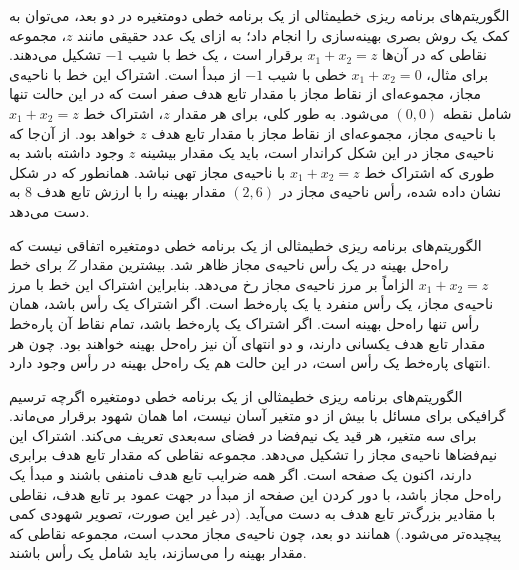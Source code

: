 \begin{itemframe-s}{الگوریتم‌های برنامه ریزی خطی}{مثالی از یک برنامه خطی دو‌متغیره}
\itm
در دو بعد، می‌توان به کمک یک روش بصری بهینه‌سازی را انجام داد؛
به ازای یک عدد حقیقی مانند
$z$،
مجموعه نقاطی که در آن‌ها
$x_1 + x_2 = z$
برقرار است ، یک خط با شیب $-1$ تشکیل می‌دهند.
برای مثال،
$x_1 + x_2 = 0$
خطی با شیب
$-1$
از مبدأ است.
\itm
اشتراک این خط با ناحیه‌ی مجاز، مجموعه‌ای از نقاط مجاز با مقدار تابع هدف صفر است که در این حالت تنها شامل نقطه $(0,0)$ می‌شود.
\itm
به طور کلی، برای هر مقدار $z$، اشتراک خط
$x_1 + x_2 = z$
با ناحیه‌ی مجاز، مجموعه‌ای از نقاط مجاز با مقدار تابع هدف $z$ خواهد بود.
\itm
از آن‌جا که ناحیه‌ی مجاز در این شکل کراندار است، باید یک مقدار بیشینه $z$ وجود داشته باشد به طوری که اشتراک خط $x_1 + x_2 = z$ با ناحیه‌ی مجاز تهی نباشد.
همانطور که در شکل نشان داده شده، رأس ناحیه‌ی مجاز در
$(2, 6)$
مقدار بهینه را با ارزش تابع هدف $8$ به دست می‌دهد.
\end{itemframe-s}


\begin{itemframe-s}{الگوریتم‌های برنامه ریزی خطی}{مثالی از یک برنامه خطی دو‌متغیره}
\itm
اتفاقی نیست که راه‌حل بهینه در یک رأس ناحیه‌ی مجاز ظاهر شد.
بیشترین مقدار $Z$ برای خط $x_1 + x_2 = z$ الزاماً بر مرز ناحیه‌ی مجاز رخ می‌دهد.
\itm
بنابراین اشتراک این خط با مرز ناحیه‌ی مجاز، یک رأس منفرد یا یک پاره‌خط است.
اگر اشتراک یک رأس باشد، همان رأس تنها راه‌حل بهینه است.
\itm
اگر اشتراک یک پاره‌خط باشد، تمام نقاط آن پاره‌خط مقدار تابع هدف یکسانی دارند، و دو انتهای آن نیز راه‌حل بهینه خواهند بود.
چون هر انتهای پاره‌خط یک رأس است، در این حالت هم یک راه‌حل بهینه در رأس وجود دارد.
\end{itemframe-s}


\begin{itemframe-s}{الگوریتم‌های برنامه ریزی خطی}{مثالی از یک برنامه خطی دو‌متغیره}
\itm
اگرچه ترسیم گرافیکی برای مسائل با بیش از دو متغیر آسان نیست، اما همان شهود برقرار می‌ماند. برای سه متغیر، هر قید یک نیم‌فضا در فضای سه‌بعدی تعریف می‌کند.
\itm
اشتراک این نیم‌فضاها ناحیه‌ی مجاز را تشکیل می‌دهد. مجموعه نقاطی که مقدار تابع هدف برابری دارند، اکنون یک صفحه است.
\itm
اگر همه ضرایب تابع هدف نامنفی باشند و مبدأ یک راه‌حل مجاز باشد، با دور کردن این صفحه از مبدأ در جهت عمود بر تابع هدف، نقاطی با مقادیر بزرگ‌تر تابع هدف به دست می‌آید. (در غیر این صورت، تصویر شهودی کمی پیچیده‌تر می‌شود.)
\itm
همانند دو بعد، چون ناحیه‌ی مجاز محدب است، مجموعه نقاطی که مقدار بهینه را می‌سازند، باید شامل یک رأس باشند.
\end{itemframe-s}


